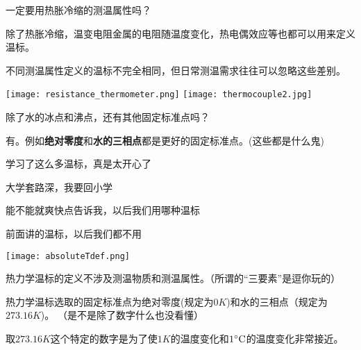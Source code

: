\documentclass[CJK]{beamer}
\begin{document}
\begin{frame}
\bch
一定要用热胀冷缩的测温属性吗？

\skipline

\bitem
\item{除了热胀冷缩，温变电阻金属的电阻随温度变化，热电偶效应等也都可以用来定义温标。}
\item{不同测温属性定义的温标不完全相同，但日常测温需求往往可以忽略这些差别。}
\eitem

\bcenter
\texttt{[image: resistance\_thermometer.png]}\hspace{0.1in}
\texttt{[image: thermocouple2.jpg]}
\ecenter
\ech
\end{frame}


\begin{frame}
\bch
除了水的冰点和沸点，还有其他固定标准点吗？

\skipline

\bitem
\item{有。例如{\bf 绝对零度}和{\bf 水的三相点}都是更好的固定标准点。(\wulian 这些都是什么鬼)}
\eitem

\ech
\end{frame}

\begin{frame}
\bch
学习了这么多温标，真是太开心了\wulian

\skiplines

大学套路深，我要回小学\wulian

\skiplines

能不能就爽快点告诉我，以后我们用哪种温标\wulian

\ech
\end{frame}


\begin{frame}
\bch
前面讲的温标，以后我们都不用\bye
\ech
\end{frame}

\begin{frame}
\bch

\texttt{[image: absoluteTdef.png]}
\bitem
\item{热力学温标的定义不涉及测温物质和测温属性。{\small \darkgray（所谓的“三要素”是逗你玩的\bye）}}
\item{热力学温标选取的固定标准点为绝对零度(规定为$0K$)和水的三相点（规定为$273.16K$)。 {\small \darkgray（是不是除了数字什么也没看懂\bye）}}
\eitem

{\small
取$273.16K$这个特定的数字是为了使$1K$的温度变化和$1^\circ \mathrm{C}$的温度变化非常接近。}
\ech
\end{frame}
\end{document}
